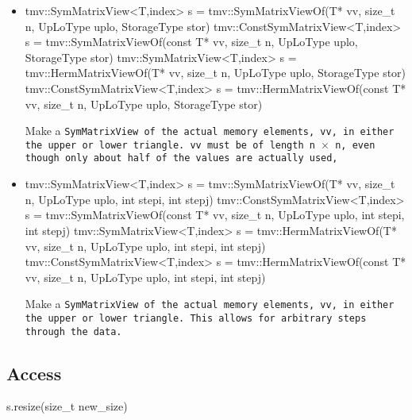 \begin{itemize}
\item
\begin{tmvcode}
tmv::SymMatrixView<T,index> s = 
      tmv::SymMatrixViewOf(T* vv, size_t n, UpLoType uplo, 
      StorageType stor)
tmv::ConstSymMatrixView<T,index> s =
      tmv::SymMatrixViewOf(const T* vv, size_t n, UpLoType uplo, 
      StorageType stor)
tmv::SymMatrixView<T,index> s =
      tmv::HermMatrixViewOf(T* vv, size_t n, UpLoType uplo, 
      StorageType stor)
tmv::ConstSymMatrixView<T,index> s =
      tmv::HermMatrixViewOf(const T* vv, size_t n, UpLoType uplo, 
      StorageType stor)
\end{tmvcode}
Make a \tt{SymMatrixView} of the actual memory elements, \tt{vv}, in either the 
upper or lower triangle.
\tt{vv} must be of length \tt{n} $\times$ \tt{n}, even though only about half 
of the values are actually used,

\item
\begin{tmvcode}
tmv::SymMatrixView<T,index> s = 
      tmv::SymMatrixViewOf(T* vv, size_t n, UpLoType uplo, 
      int stepi, int stepj)
tmv::ConstSymMatrixView<T,index> s =
      tmv::SymMatrixViewOf(const T* vv, size_t n, UpLoType uplo, 
      int stepi, int stepj)
tmv::SymMatrixView<T,index> s =
      tmv::HermMatrixViewOf(T* vv, size_t n, UpLoType uplo, 
      int stepi, int stepj)
tmv::ConstSymMatrixView<T,index> s =
      tmv::HermMatrixViewOf(const T* vv, size_t n, UpLoType uplo, 
      int stepi, int stepj)
\end{tmvcode}
Make a \tt{SymMatrixView} of the actual memory elements, \tt{vv}, in either the 
upper or lower triangle.  This allows for arbitrary steps through the data.

\end{itemize}

\subsection{Access}
\label{SymMatrix_Access}

\begin{tmvcode}
s.resize(size_t new_size)
\end{tmvcode}

